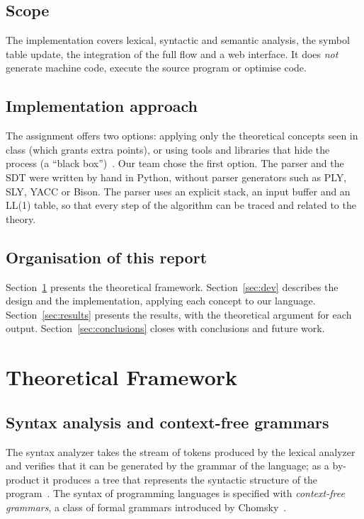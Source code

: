 \documentclass[11pt,a4paper]{article}
\begin{document}
\subsection{Scope}
The implementation covers lexical, syntactic and semantic analysis, the symbol table update, the integration of the full flow and a web interface. It does \emph{not} generate machine code, execute the source program or optimise code.

\subsection{Implementation approach}
The assignment offers two options: applying only the theoretical concepts seen in class (which grants extra points), or using tools and libraries that hide the process (a ``black box'')~\cite{assignment}. Our team chose the first option. The parser and the SDT were written by hand in Python, without parser generators such as PLY, SLY, YACC or Bison. The parser uses an explicit stack, an input buffer and an LL(1) table, so that every step of the algorithm can be traced and related to the theory.

\subsection{Organisation of this report}
Section~\ref{sec:theory} presents the theoretical framework. Section~\ref{sec:dev} describes the design and the implementation, applying each concept to our language. Section~\ref{sec:results} presents the results, with the theoretical argument for each output. Section~\ref{sec:conclusions} closes with conclusions and future work.

\section{Theoretical Framework}
\label{sec:theory}

\subsection{Syntax analysis and context-free grammars}
The syntax analyzer takes the stream of tokens produced by the lexical analyzer and verifies that it can be generated by the grammar of the language; as a by-product it produces a tree that represents the syntactic structure of the program~\cite{aho}. The syntax of programming languages is specified with \emph{context-free grammars}, a class of formal grammars introduced by Chomsky~\cite{chomsky}.
\end{document}
